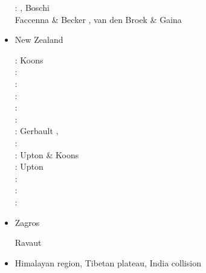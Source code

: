 \begin{itemize}
\begin{scriptsize}
\cite{pimo97}\cite{nesg97}
\cite{nesb99}
\cite{wosp00}
\cite{pimo03}
\twothousandfour: \cite{spwo04}, Boschi \etal \cite{boek04}\\
\cite{wogs09}
\cite{bofb10}\cite{fabe10}
\cite{chsv14}\cite{chsg14}\cite{vavs14}\cite{mafv14}
\cite{mesj16}
\cite{spcv18}
\cite{blgf20}
Faccenna \& Becker \cite{fabe20}, van den Broek \& Gaina \cite{vaga20}
\end{scriptsize}

\item {New Zealand} 
\begin{scriptsize}
\nineteenninety: Koons \cite{koon90}\\
\nineteenninetyfive: \cite{brbe95}\\
\nineteenninetysix: \cite{bekh96}\\
\nineteenninetyeight: \cite{wabb98}\\
\nineteenninetynine: \cite{babr99}\\
\twothousandtwo: \cite{gedh02}\cite{pybf02}\\
\twothousandthree: Gerbault \etal \cite{gehd03}, \cite{konc03}\cite{upke03}\\
\twothousandsix: \cite{libi06}\\
\twothousandseven: Upton \& Koons \cite{upko07}\\
\twothousandnine: Upton \etal \cite{upkc09}\\
\twothousandten: \cite{pyeg10}\cite{spgs10a}\\
\twothousandtwelve: \cite{grel12}\\
\twothousandthirteen: \cite{sths13}
\end{scriptsize}

\item {Zagros} 

\begin{scriptsize}
Ravaut \etal \cite{rabh97}
\cite{vech06}
\cite{hamo10}
\cite{yakm11}
\cite{nipc13}
\cite{frba14}
\cite{ghbu14}
\cite{coyc16}
\cite{rugb17}
\end{scriptsize}

\item {Himalayan region, Tibetan plateau, India collision} 


\end{itemize}
